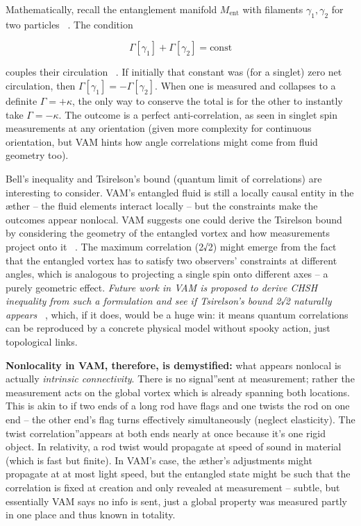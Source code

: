 \documentclass[a4paper, aps,preprint,superscriptaddress, 12pt]{revtex4}
\begin{document}
Mathematically, recall the entanglement manifold $M_{\text{ent}}$ with filaments ${\gamma_1, \gamma_2}$ for two particles~\cite{Iskandarani2025c} . The condition

\begin{equation}
    \Gamma[\gamma_1] + \Gamma[\gamma_2] = \text{const}
\end{equation}

couples their circulation~\cite{Iskandarani2025c} . If initially that constant was (for a singlet) zero net circulation, then $\Gamma[\gamma_1] = -\Gamma[\gamma_2]$. When one is measured and collapses to a definite $\Gamma = +\kappa$, the only way to conserve the total is for the other to instantly take $\Gamma = -\kappa$. The outcome is a perfect anti-correlation, as seen in singlet spin measurements at any orientation (given more complexity for continuous orientation, but VAM hints how angle correlations might come from fluid geometry too).


Bell's inequality and Tsirelson's bound (quantum limit of correlations) are interesting to consider. VAM's entangled fluid is still a locally causal entity in the æther – the fluid elements interact locally – but the constraints make the outcomes appear nonlocal. VAM suggests one could derive the Tsirelson bound by considering the geometry of the entangled vortex and how measurements project onto it~\cite{Iskandarani2025c} . The maximum correlation (2√2) might emerge from the fact that the entangled vortex has to satisfy two observers' constraints at different angles, which is analogous to projecting a single spin onto different axes – a purely geometric effect. \textit{Future work in VAM is proposed to derive CHSH inequality from such a formulation and see if Tsirelson's bound 2√2 naturally appears}~\cite{Iskandarani2025c} , which, if it does, would be a huge win: it means quantum correlations can be reproduced by a concrete physical model without spooky action, just topological links.


\textbf{Nonlocality in VAM, therefore, is demystified:} what appears nonlocal is actually \textit{intrinsic connectivity}. There is no \grqq signal\textquotedblright sent at measurement; rather the measurement acts on the global vortex which is already spanning both locations. This is akin to if two ends of a long rod have flags and one twists the rod on one end – the other end's flag turns effectively simultaneously (neglect elasticity). The twist \grqq correlation\textquotedblright appears at both ends nearly at once because it's one rigid object. In relativity, a rod twist would propagate at speed of sound in material (which is fast but finite). In VAM's case, the æther's adjustments might propagate at at most light speed, but the entangled state might be such that the correlation is fixed at creation and only revealed at measurement – subtle, but essentially VAM says no info is sent, just a global property was measured partly in one place and thus known in totality.
\end{document}
